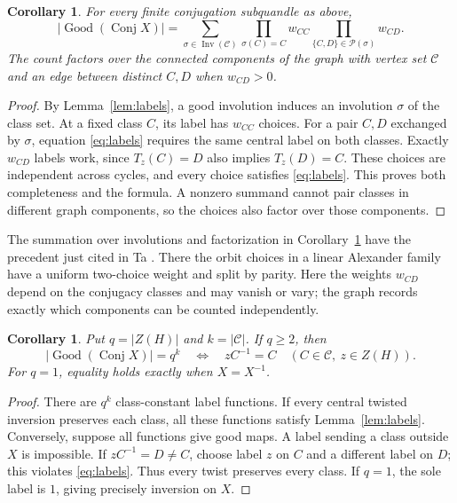 \documentclass[11pt]{article}
\newtheorem{corollary}[theorem]{Corollary}
\newcommand{\Good}{\operatorname{Good}}
\newcommand{\Conj}{\operatorname{Conj}}
\newcommand{\Inv}{\operatorname{Inv}}
\begin{document}
\begin{corollary}\label{cor:formula}
For every finite conjugation subquandle as above,
\begin{equation}\label{eq:formula}
 |\Good(\Conj X)|=
 \sum_{\sigma\in\Inv(\mathcal C)}
 \prod_{\sigma(C)=C}w_{CC}
 \prod_{\{C,D\}\in\mathcal P(\sigma)}w_{CD}.
\end{equation}
The count factors over the connected components of the graph with vertex
set $\mathcal C$ and an edge between distinct $C,D$ when $w_{CD}>0$.
\end{corollary}
\begin{proof}
By Lemma~\ref{lem:labels}, a good involution induces an involution $\sigma$
of the class set. At a fixed class $C$, its label has $w_{CC}$ choices.
For a pair $C,D$ exchanged by $\sigma$, equation \eqref{eq:labels}
requires the same central label on both classes. Exactly $w_{CD}$ labels
work, since $T_z(C)=D$ also implies $T_z(D)=C$.
These choices are independent across cycles, and every choice satisfies
\eqref{eq:labels}. This proves both completeness and the formula.
A nonzero summand cannot pair classes in different graph components,
so the choices also factor over those components.
\end{proof}

The summation over involutions and factorization in
Corollary~\ref{cor:formula} have the precedent just cited in
Ta \cite[Lemma 5.10 and Theorem 5.11]{TaTwisted}.
There the orbit choices in a linear Alexander family have a uniform
two-choice weight and split by parity. Here the weights $w_{CD}$ depend
on the conjugacy classes and may vanish or vary; the graph records exactly
which components can be counted independently.

\begin{corollary}\label{cor:equality}
Put $q=|Z(H)|$ and $k=|\mathcal C|$. If $q\ge2$, then
\[
 |\Good(\Conj X)|=q^k
 \quad\Longleftrightarrow\quad
 zC^{-1}=C\quad(C\in\mathcal C,\ z\in Z(H)).
\]
For $q=1$, equality holds exactly when $X=X^{-1}$.
\end{corollary}
\begin{proof}
There are $q^k$ class-constant label functions. If every central
twisted inversion preserves each class, all these functions satisfy
Lemma~\ref{lem:labels}. Conversely, suppose all functions give good maps.
A label sending a class outside $X$ is impossible. If $zC^{-1}=D\ne C$,
choose label $z$ on $C$ and a different label on $D$; this violates
\eqref{eq:labels}. Thus every twist preserves every class.
If $q=1$, the sole label is $1$, giving precisely inversion on $X$.
\end{proof}
\end{document}

